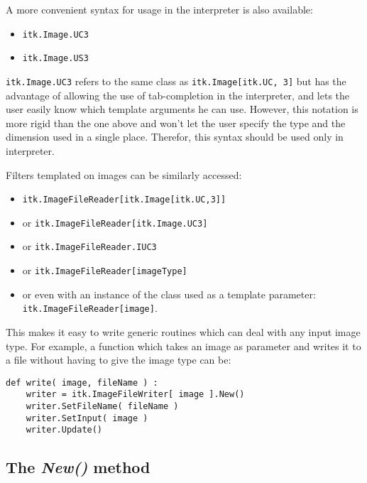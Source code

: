\documentclass{InsightArticle}
\begin{document}
A more convenient syntax for usage in the interpreter is also available:
\begin{itemize}
  \item \verb$itk.Image.UC3$
  \item \verb$itk.Image.US3$
\end{itemize}
\verb$itk.Image.UC3$ refers to the same class as \verb$itk.Image[itk.UC, 3]$
but has the advantage of allowing the use of tab-completion in the interpreter,
and lets the user easily know which template arguments he can use.
However, this notation is more rigid than the one above and won't let the user
specify the type and the dimension used in a single place. Therefor, this syntax
should be used only in interpreter.

Filters templated on images can be similarly accessed:
\begin{itemize}
  \item \verb$itk.ImageFileReader[itk.Image[itk.UC,3]]$
  \item or \verb$itk.ImageFileReader[itk.Image.UC3]$
  \item or \verb$itk.ImageFileReader.IUC3$
  \item or \verb$itk.ImageFileReader[imageType]$
  \item or even with an instance of the class used as a template parameter: \verb$itk.ImageFileReader[image]$.
\end{itemize}
This makes it easy to write generic routines which
can deal with any input image type. For example, a function which takes an image
as parameter and writes it to a file without having to give the image type can be:
\begin{verbatim}
def write( image, fileName ) :
    writer = itk.ImageFileWriter[ image ].New()
    writer.SetFileName( fileName )
    writer.SetInput( image )
    writer.Update()
\end{verbatim}


     \subsection{The {\em New()} method}
\end{document}
